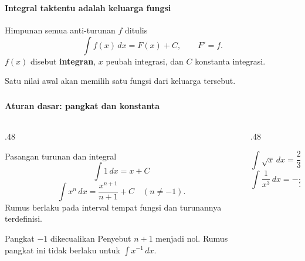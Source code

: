 \documentclass{../../kalkulus-ppt}
\begin{document}
\begin{frame}
\frametitle{\insertsection}
\framesubtitle{Integral taktentu adalah keluarga fungsi}

\begin{definisi}
Himpunan semua anti-turunan $f$ ditulis
\[\int f(x)\,dx=F(x)+C,\qquad F'=f.\]
$f(x)$ disebut \textbf{integran}, $x$ peubah integrasi, dan $C$ konstanta integrasi.
\end{definisi}
Satu nilai awal akan memilih satu fungsi dari keluarga tersebut.
\end{frame}

\begin{frame}
\frametitle{\insertsection}
\framesubtitle{Aturan dasar: pangkat dan konstanta}
\begin{columns}[c]
\begin{column}{.48\textwidth}

\begin{block}{Pasangan turunan dan integral}
\[\int 1\,dx=x+C\]
\[\int x^n\,dx=\frac{x^{n+1}}{n+1}+C\quad(n\ne-1).\]
Rumus berlaku pada interval tempat fungsi dan turunannya terdefinisi.
\end{block}
\begin{alertblock}{Pangkat $-1$ dikecualikan}
Penyebut $n+1$ menjadi nol. Rumus pangkat ini tidak berlaku untuk $\int x^{-1}\,dx$.
\end{alertblock}
\end{column}
\begin{column}{.48\textwidth}

\begin{contoh}
\[\int\sqrt{x}\,dx=\frac23x^{3/2}+C\]
\[\int\frac1{x^3}\,dx=-\frac1{2x^2}+C\]
\end{contoh}
\end{column}
\end{columns}
\end{frame}
\end{document}
